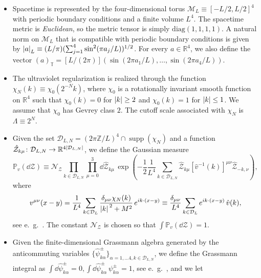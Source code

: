 \documentclass[a4paper, 11pt]{article}
\newcommand{\Z}{\mathbb{Z}}									%
\newcommand{\R}{\mathbb{R}}
\newcommand{\dgauss}[2]{\mathbb{P}_{#1}(\dd #2)}			%
\newcommand{\cutoff}{\Lambda}								%
\newcommand{\torus}{{\scriptstyle{\mathbb{T}}}}				%
\DeclareMathOperator{\supp}{supp}							%
\theoremstyle{thm}
\begin{document}
\begin{itemize}
\item Spacetime is represented by the four-dimensional torus $\mathcal{M}_L \equiv [-L/2, L/2]^4$ with periodic boundary conditions and a finite volume $L^4$. The spacetime metric is \emph{Euclidean}, so the metric tensor is simply $\mathrm{diag}(1, 1, 1, 1)$. A natural norm on $\mathcal{M}_L$ that is compatible with periodic boundary conditions is given by $\abs{a}_L \equiv (L/\pi)(\sum_{j=1}^4 \sin^2(\pi a_j/L))^{1/2}$. For every $a \in \R^4$, we also define the vector $(a)_\torus = [L/(2\pi)](\sin(2\pi a_1/L), \dots, \sin(2\pi a_4/L))$.
\item The ultraviolet regularization is realized through the function $\chi_N(k) \equiv \chi_0(2^{-N}k)$, where $\chi_0$ is a rotationally invariant smooth function on $\R^4$ such that $\chi_0(k)=0$ for $\abs{k} \ge 2$ and $\chi_0(k)=1$ for $\abs{k} \le 1$. We assume that $\chi_0$ has Gevrey class $2$. The cutoff scale associated with $\chi_N$ is $\cutoff \equiv 2^N$.
\item Given the set $\mathcal{D}_{L, N} = (2\pi \Z/L)^4 \cap \supp(\chi_N)$ and a function $\hat{\mathcal{Z}}_{k \mu} \colon \mathcal{D}_{L, N} \to \R^{4 \abs*{\mathcal{D}_{L, N}}}$, we define the Gaussian measure
\begin{equation}
\label{eq:bosonic_gaussian_measure}
\dgauss{v}{\mathcal{Z}} \equiv \mathcal{N}_\mathcal{Z} \prod_{k \in \mathcal{D}_{L, N}} \prod_{\mu = 0}^3 \dd{\hat{\mathcal{Z}}_{k \mu}} \, \exp \left( - \frac{1}{2} \frac{1}{L^4} \sum_{k \in \mathcal{D}_{L, N}} \!\!\! \hat{\mathcal{Z}}_{k \mu} \left[\hat{v}^{-1}(k) \right]^{\mu \nu} \! \hat{\mathcal{Z}}_{-k, \nu} \right),
\end{equation}
where
\begin{equation}
\label{eq:free_boson_propagator}
v^{\mu \nu}(x-y) =\frac{1}{L^4} \sum_{k \in \mathcal{D}_{L}} \frac{\delta_{\mu \nu} \chi_N(k)}{\abs*{k}^2 + M^2} \, e^{i k \cdot (x-y)} \equiv \frac{\delta_{\mu \nu}}{L^4} \sum_{k \in \mathcal{D}_{L}} e^{i k \cdot (x-y)} \, \hat{v}(k),
\end{equation}
see e.\ g.~\cite{Bauerschmidt_2019}. The constant $\mathcal{N}_\mathcal{Z}$ is chosen so that $\int \dgauss{v}{\mathcal{Z}} = 1$.
\item Given the finite-dimensional Grassmann algebra generated by the anticommuting variables $\lbrace \hat{\psi}^\pm_{k \alpha} \rbrace_{\alpha=1, \dots 4, k \in \mathcal{D}_{L, N}}$, we define the Grassmann integral as
$\int \dd{\hat{\psi}^\pm_{k \alpha}} = 0, \int \dd{\hat{\psi}^\pm_{k \alpha}} \, \psi^{\pm}_{k \alpha} = 1$, see e.\ g.~\cite{Feldman_2002}, and we let

\end{itemize}
\end{document}
